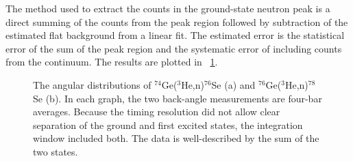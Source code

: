 The method used to extract the counts in the ground-state neutron peak is a direct summing of the counts from the peak region followed by subtraction of the estimated flat background from a linear fit.  The estimated error is the statistical error of the sum of the peak region and the systematic error of including counts from the continuum.  The results are plotted in {\fig}~\ref{fig:PS_angularDistribution}.
\begin{figure}[!htbp]
\centering
{}
\caption{The angular distributions of $^{74}$Ge($^3$He,n)$^{76}$Se (a) and $^{76}$Ge($^3$He,n)$^{78}$Se (b).  In each graph, the two back-angle measurements are four-bar averages.  Because the timing resolution did not allow clear separation of the ground and first excited states, the integration window included both.  The data is well-described by the sum of the two states.}
\label{fig:PS_angularDistribution}
\end{figure}


